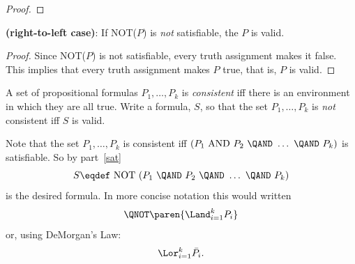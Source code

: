 \documentclass[handout]{mcs}
\begin{document}
\begin{problem}
\begin{solution}
\begin{proof}
\end{proof}

\textbf{(right-to-left case)}: If NOT($P$) is \emph{not}
satisfiable, the $P$ is valid.

\begin{proof}
  Since NOT($P$) is not satisfiable, every truth assignment makes it
  false.  This implies that every truth assignment makes $P$ true, that
  is, $P$ is valid.

\end{proof}
\end{solution}

\ppart A set of propositional formulas $P_1,\dots,P_k$ is
\emph{consistent} iff there is an environment in which they are all
true.  Write a formula, $S$, so that the set $P_1,\dots,P_k$ is \emph{not}
consistent iff $S$ is valid.

\begin{solution}
Note that the set $P_1,\dots,P_k$ is consistent iff $(P_1 \text{
AND } P_2\ \QAND\ \dots\ \QAND\ P_k)$ is satisfiable.  So by
part~\eqref{sat}
\[
S \eqdef \text{ NOT }(P_1\ \QAND\ P_2\ \QAND\ \dots\ \QAND\ P_k)
\]
is the desired formula. In more concise notation this would written
\[
\QNOT\paren{\Land_{i=1}^k P_i}
\]
or, using DeMorgan's Law:
\[
\Lor_{i=1}^k \bar{P_i}.
\]

\end{solution}

\eparts
\end{problem}

\fi
\end{document}

